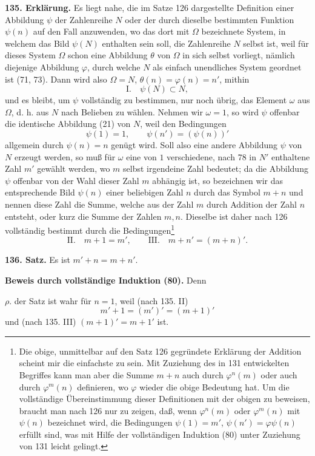 \documentclass[11pt]{article}
\newcommand{\partof}{\mathrel{\subset}}
\begin{document}
\noindent\textbf{135. Erklärung.} Es liegt nahe, die im Satze 126 dargestellte Definition einer Abbildung $\psi$ der Zahlenreihe $N$ oder der durch dieselbe bestimmten Funktion $\psi(n)$ auf den Fall anzuwenden, wo das dort mit $\Omega$ bezeichnete System, in welchem das Bild $\psi(N)$ enthalten sein soll, die Zahlenreihe $N$ selbst ist, weil für dieses System $\Omega$ schon eine Abbildung $\theta$ von $\Omega$ in sich selbst vorliegt, nämlich diejenige Abbildung $\varphi$, durch welche $N$ als einfach unendliches System geordnet ist (71, 73). Dann wird also $\Omega=N$, $\theta(n)=\varphi(n)=n'$, mithin
\[
\text{I.}\quad \psi(N)\partof N,
\]
und es bleibt, um $\psi$ vollständig zu bestimmen, nur noch übrig, das Element $\omega$ aus $\Omega$, d. h. aus $N$ nach Belieben zu wählen. Nehmen wir $\omega=1$, so wird $\psi$ offenbar die identische Abbildung (21) von $N$, weil den Bedingungen
\[
\psi(1)=1,\qquad \psi(n')=(\psi(n))'
\]
allgemein durch $\psi(n)=n$ genügt wird. Soll also eine andere Abbildung $\psi$ von $N$ erzeugt werden, so muß für $\omega$ eine von $1$ verschiedene, nach 78 in $N'$ enthaltene Zahl $m'$ gewählt werden, wo $m$ selbst irgendeine Zahl bedeutet; da die Abbildung $\psi$ offenbar von der Wahl dieser Zahl $m$ abhängig ist, so bezeichnen wir das entsprechende Bild $\psi(n)$ einer beliebigen Zahl $n$ durch das Symbol $m+n$ und nennen diese Zahl die Summe, welche aus der Zahl $m$ durch Addition der Zahl $n$ entsteht, oder kurz die Summe der Zahlen $m,n$. Dieselbe ist daher nach 126 vollständig bestimmt durch die Bedingungen\footnote{Die obige, unmittelbar auf den Satz 126 gegründete Erklärung der Addition scheint mir die einfachste zu sein. Mit Zuziehung des in 131 entwickelten Begriffes kann man aber die Summe $m+n$ auch durch $\varphi^n(m)$ oder auch durch $\varphi^m(n)$ definieren, wo $\varphi$ wieder die obige Bedeutung hat. Um die vollständige Übereinstimmung dieser Definitionen mit der obigen zu beweisen, braucht man nach 126 nur zu zeigen, daß, wenn $\varphi^n(m)$ oder $\varphi^m(n)$ mit $\psi(n)$ bezeichnet wird, die Bedingungen $\psi(1)=m'$, $\psi(n')=\varphi\psi(n)$ erfüllt sind, was mit Hilfe der vollständigen Induktion (80) unter Zuziehung von 131 leicht gelingt.}
\[
\text{II.}\quad m+1=m',
\qquad
\text{III.}\quad m+n'=(m+n)'.
\]

\noindent\textbf{136. Satz.} Es ist $m'+n=m+n'$.

\noindent\textbf{Beweis durch vollständige Induktion (80).} Denn

\noindent $\rho.$ der Satz ist wahr für $n=1$, weil (nach 135. II)
\[
m'+1=(m')'=(m+1)'
\]
und (nach 135. III) $(m+1)'=m+1'$ ist.
\end{document}
